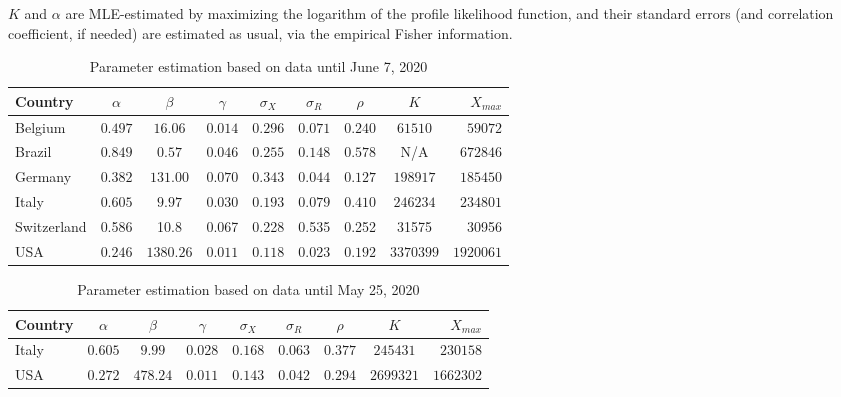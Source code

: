 \documentclass{article}
\begin{document}
\bigskip

\noindent $K$ and $\alpha$ are MLE-estimated by maximizing the logarithm of the profile likelihood function, and their standard errors (and correlation coefficient, if needed) are estimated as usual, via the empirical Fisher information.

\newpage

\begin{table}
\begin{center}
\begin{tabular}{l|ccccccc|r}
Country & $\alpha$ & $\beta$ & $\gamma$ & $\sigma_X $ & $ \sigma_R$ & $\rho$ & $K$ & $X_{max}$ \\ \hline
Belgium & $0.497$ & $16.06$ & $0.014$ & $0.296$ & $0.071$ & $0.240$ & $61510$ & $59072$ \\
Brazil  & $0.849$ & $0.57$ & $0.046$ & $0.255$ & $0.148$ & $0.578$ & N/A & $672846$ \\
Germany & $0.382$ & $131.00$ & $0.070$ & $0.343$ & $0.044$ & $0.127$ & $198917$ & $185450$ \\
Italy  & $0.605$ & $9.97$ & $0.030$ & $0.193$ & $0.079$ & $0.410$ & $246234$ & $234801$ \\
Switzerland & 0.586	 &	10.8 & 0.067 & 0.228  & 0.535 & 0.252 & 31575&      30956	    \\
USA    & $0.246$  & $1380.26$ & $0.011$ & $0.118$ & $0.023$ & $0.192$ & $3370399$ & $1920061$ \\ \hline
\end{tabular}
\caption{
Parameter estimation based on data until June 7, 2020
\label{tablejune7}
}
\end{center}
\end{table}

\bigskip

\begin{table}
\begin{center}
\begin{tabular}{l|ccccccc|r}
Country & $\alpha$ & $\beta$ & $\gamma$ & $\sigma_X $ & $ \sigma_R$ & $\rho$ & $K$ & $X_{max}$ \\ \hline
Italy  & $0.605$ & $9.99$ & $0.028$ & $0.168$ & $0.063$ & $0.377$ & $245431$ & $230158$ \\
USA    & $0.272$  & $478.24$ & $0.011$ & $0.143$ & $0.042$ & $0.294$ & $2699321$ & $1662302$\\ \hline
\end{tabular}
\caption{
Parameter estimation based on data until May 25, 2020
\label{tablemay25}
}
\end{center}
\end{table}
\end{document}
